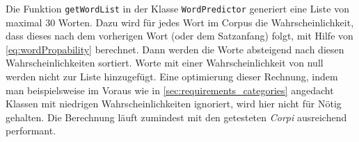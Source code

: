     Die Funktion \texttt{getWordList} in der Klasse \texttt{WordPredictor} generiert eine Liste von maximal 30 Worten.
    Dazu wird für jedes Wort im Corpus die Wahrscheinlichkeit, dass dieses nach dem vorherigen Wort (oder dem Satzanfang) folgt, mit Hilfe von \autoref{eq:wordPropability} berechnet. Dann werden die Worte absteigend nach diesen Wahrscheinlichkeiten sortiert. Worte mit einer Wahrscheinlichkeit von null werden nicht zur Liste hinzugefügt. Eine optimierung dieser Rechnung, indem man beispielsweise im Voraus wie in \autoref{sec:requirements_categories} angedacht Klassen mit niedrigen Wahrscheinlichkeiten ignoriert, wird hier nicht für Nötig gehalten. Die Berechnung läuft zumindest mit den getesteten \emph{Corpi} ausreichend performant.
    
   
    
    
    
    
    
    
    
    
    
    
    
    
    
    
    
    
    
    
